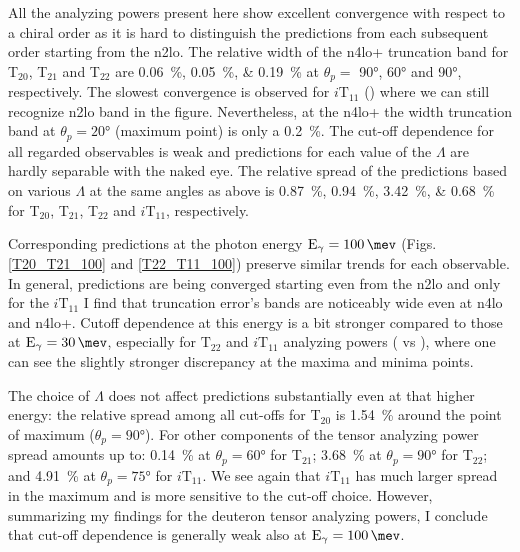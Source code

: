     All the analyzing powers present here show excellent convergence 
    with respect to a chiral order as it is hard to distinguish the predictions
    from each subsequent order starting from the \gls{n2lo}.
    The relative width of the \gls{n4lo+} truncation band 
    for T$_{20}$, T$_{21}$ and T$_{22}$
    are \SIlist{0.06; 0.05; 0.19}{\percent} at $\theta_p=$ \ang{90}, \ang{60} and \ang{90}, respectively.
    The slowest convergence is observed for $i\text{T}_{11}$ ()
    where we can still recognize \gls{n2lo} band in the figure.
    Nevertheless, at the \gls{n4lo+}
    the width truncation band at $\theta_p = \ang{20}$ (maximum point)
    is only a \SI{0.2}{\percent}.
    The cut-off dependence for all regarded observables is weak and 
    predictions for each value of the $\Lambda$ are hardly separable 
    with the naked eye.
    The relative spread of the predictions based on various $\Lambda$ at the same angles as above 
    is \SIlist{0.87; 0.94; 3.42; 0.68}{\percent} for T$_{20}$, T$_{21}$, T$_{22}$ and $i\text{T}_{11}$, respectively.


    Corresponding predictions at the photon energy $\text{E}_\gamma = \SI{100}{\mev}$
    (Figs. \ref{T20_T21_100} and \ref{T22_T11_100}) preserve similar
    trends for each observable. 
    In general, predictions are being converged starting
    even from the \gls{n2lo} and only for the $i\text{T}_{11}$
    I find
    that truncation error's bands are noticeably wide
    even at \gls{n4lo} and \gls{n4lo+}.
    Cutoff dependence at this energy is a bit stronger
    compared to those at $\text{E}_\gamma = \SI{30}{\mev}$, especially
    for 
    $\text{T}_{22}$ and $i\text{T}_{11}$ analyzing powers ( vs ),
    where one can see 
    the slightly stronger discrepancy at the maxima and minima points.
    
    The choice of $\Lambda$ does not affect predictions substantially
    even at that higher energy:
    the relative spread among all cut-offs for T$_{20}$ is \SI{1.54}{\percent}
    around the point of maximum ($\theta_p = \ang{90}$).
    For other components of the tensor analyzing power spread amounts up to:
    \SI{0.14}{\percent} at $\theta_p = \ang{60}$ for T$_{21}$;
    \SI{3.68}{\percent} at $\theta_p = \ang{90}$ for T$_{22}$;
    and \SI{4.91}{\percent} at $\theta_p = \ang{75}$ for $i\text{T}_{11}$.
    We see again that $i\text{T}_{11}$ has much larger spread in the maximum and
    is more sensitive to the cut-off choice.
    However, summarizing my findings 
    for the deuteron tensor analyzing powers,
    I conclude that cut-off dependence is generally weak
    also at $\text{E}_\gamma = \SI{100}{\mev}$.

